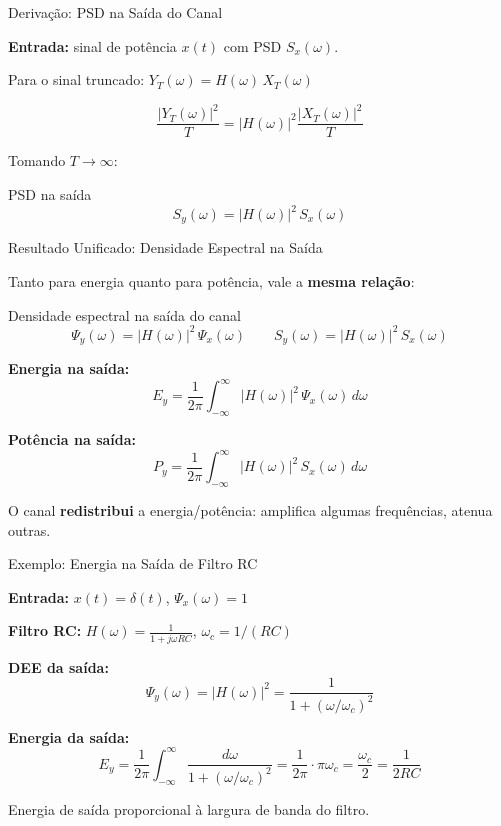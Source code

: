 
\begin{frame}{Derivação: PSD na Saída do Canal}

\textbf{Entrada:} sinal de potência $x(t)$ com PSD $S_x(\omega)$.

Para o sinal truncado: $Y_T(\omega) = H(\omega)\, X_T(\omega)$

\[
\frac{|Y_T(\omega)|^2}{T} = |H(\omega)|^2 \frac{|X_T(\omega)|^2}{T}
\]

Tomando $T \to \infty$:

\begin{block}{PSD na saída}
\[
\boxed{S_y(\omega) = |H(\omega)|^2\, S_x(\omega)}
\]
\end{block}

\end{frame}


\begin{frame}{Resultado Unificado: Densidade Espectral na Saída}

Tanto para energia quanto para potência, vale a \textbf{mesma relação}:

\begin{block}{Densidade espectral na saída do canal}
\[
\Psi_y(\omega) = |H(\omega)|^2\, \Psi_x(\omega) \qquad S_y(\omega) = |H(\omega)|^2\, S_x(\omega)
\]
\end{block}

\textbf{Energia na saída:}
\[
E_y = \frac{1}{2\pi} \int_{-\infty}^{\infty} |H(\omega)|^2\, \Psi_x(\omega)\, d\omega
\]

\textbf{Potência na saída:}
\[
P_y = \frac{1}{2\pi} \int_{-\infty}^{\infty} |H(\omega)|^2\, S_x(\omega)\, d\omega
\]

O canal \textbf{redistribui} a energia/potência: amplifica algumas frequências, atenua outras.

\end{frame}


\begin{frame}{Exemplo: Energia na Saída de Filtro RC}

\textbf{Entrada:} $x(t) = \delta(t)$, \quad $\Psi_x(\omega) = 1$

\textbf{Filtro RC:} $H(\omega) = \frac{1}{1 + j\omega RC}$, \quad $\omega_c = 1/(RC)$

\textbf{DEE da saída:}
\[
\Psi_y(\omega) = |H(\omega)|^2 = \frac{1}{1 + (\omega/\omega_c)^2}
\]

\textbf{Energia da saída:}
\[
E_y = \frac{1}{2\pi} \int_{-\infty}^{\infty} \frac{d\omega}{1 + (\omega/\omega_c)^2} = \frac{1}{2\pi} \cdot \pi\omega_c = \frac{\omega_c}{2} = \frac{1}{2RC}
\]

Energia de saída proporcional à largura de banda do filtro.

\end{frame}

